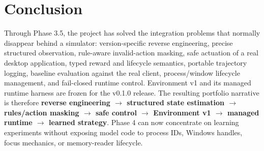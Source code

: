 \documentclass[11pt,a4paper]{article}
\begin{document}
\section{Conclusion}
Through Phase 3.5, the project has solved the integration problems that normally disappear behind a simulator: version-specific reverse engineering, precise structured observation, rule-aware invalid-action masking, safe actuation of a real desktop application, typed reward and lifecycle semantics, portable trajectory logging, baseline evaluation against the real client, process/window lifecycle management, and fail-closed runtime control. Environment v1 and its managed runtime harness are frozen for the v0.1.0 release. The resulting portfolio narrative is therefore \textbf{reverse engineering $\rightarrow$ structured state estimation $\rightarrow$ rules/action masking $\rightarrow$ safe control $\rightarrow$ Environment v1 $\rightarrow$ managed runtime $\rightarrow$ learned strategy}. Phase 4 can now concentrate on learning experiments without exposing model code to process IDs, Windows handles, focus mechanics, or memory-reader lifecycle.
\end{document}
